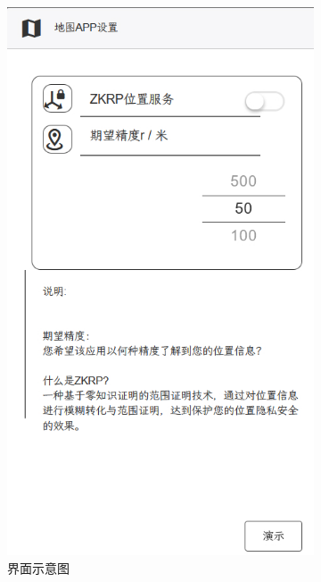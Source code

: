 \documentclass[zihao=-4]{ctexart}
\begin{document}
\begin{figure}[htbp]
  \centering
  \begin{subfigure}{0.31\textwidth}
    \includegraphics[width=\linewidth]{前端-2.jpg}
    \caption{界面示意图} 
  \end{subfigure}%
  \hspace*{2cm}   %
  \begin{subfigure}{0.31\textwidth}

\end{subfigure}
\end{figure}
\end{document}
